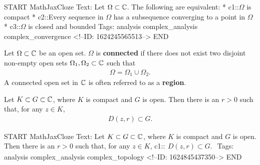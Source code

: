 \documentclass{memoir}
\begin{document}
\begin{anki}
START
MathJaxCloze
Text: 
Let \(\Omega \subset \mathbb{C}\). The following are equivalent:
* {{c1::\(\Omega\) is compact}}
* {{c2::Every sequence in \(\Omega\) has a subsequence converging to a point in \(\Omega\)}}
* {{c3::\(\Omega\) is closed and bounded}} 
Tags: analysis complex_analysis complex_convergence
<!--ID: 1624245565513-->
END
\end{anki}

\begin{defn}
	Let \(\Omega\subset \mathbb{C}\) be an open set. \(\Omega\) is \textbf{connected} if there does not exist two disjoint non-empty open sets \(\Omega_1,\Omega_2\subset \mathbb{C}\) such that
	\begin{align*}
		\Omega = \Omega_1\cup \Omega_2.
	\end{align*}
	A connected open set in \(\mathbb{C}\) is often referred to as a \textbf{region}.
\end{defn}

\begin{thm}
	Let \(K\subset G\subset \mathbb{C}\), where \(K\) is compact and \(G\) is open. Then there is an \(r>0\) such that, for any \(z \in K\),
	\begin{align*}
		D(z,r) \subset G.
	\end{align*}
\end{thm}

\begin{anki}
START
MathJaxCloze
Text: Let \(K\subset G\subset \mathbb{C}\), where \(K\) is compact and \(G\) is open. Then there is an \(r>0\) such that, for any \(z \in K\),
 {{c1::\(\begin{align*}
        	D(z,r) \subset G.
        \end{align*}\)}}
Tags: analysis complex_analysis complex_topology
<!--ID: 1624845437350-->
END
\end{anki}
\end{document}
